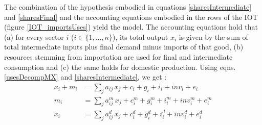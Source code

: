 \documentclass[12pt,english]{article}
\begin{document}
The combination of the hypothesis embodied in equations \ref{sharesIntermediate} and \ref{sharesFinal} and the accounting equations embodied in the rows of the IOT (figure \ref{IOT_importsUses}) yield the model. The accounting equations hold that (a) for every sector $i$ ($i \in \{1,\ldots,n\}$), its total output $x_i$ is given by the sum of total intermediate inputs plus final demand minus imports of that good, (b) resources stemming from importation are used for final and intermediate consumption and (c) the same holds for domestic production. Using eqns.\ref{usesDecompMX} and \ref{sharesIntermediate}, we get : %
\begin{align}
x_i + m_i &= \sum_j a_{ij} \, x_j + c_i + g_i + i_i + inv_i + e_i \label{useAll} \\
m_i &= \sum_j a_{ij}^m \, x_j+ c_i^m + g_i^m + i_i^m + inv_i^m + e_i^m \label{useImports} \\
x_i &= \sum_j a_{ij}^d \, x_j + c_i^d + g_i^d + i_i^d + inv_i^d + e_i^d \label{useOutput} 
\end{align}


\end{document}
